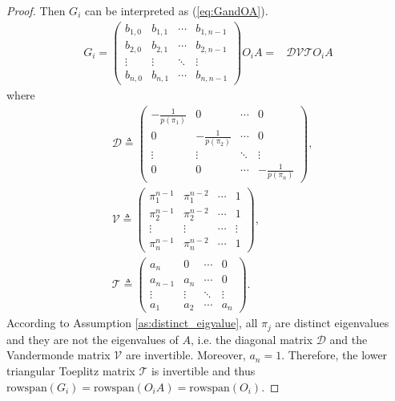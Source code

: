 \documentclass[journal]{IEEEtran}
\newcommand{\rs}{\text{rowspan}}
\newtheorem*{proof}{\textbf{Proof}}
\begin{document}
\begin{proof}
		Then $G_i$ can be interpreted as (\ref{eq:GandOA}).
		\begin{align}
			G_i = \begin{pmatrix}
				b_{1,0} & b_{1,1} & \cdots  & b_{1,n-1} \\
				b_{2,0} & b_{2,1} & \cdots  & b_{2,n-1} \\
				\vdots & \vdots & \ddots  & \vdots \\
				b_{n,0} & b_{n,1} & \cdots  & b_{n,n-1} 
			\end{pmatrix}
			O_i A 
			= & \mathcal{D}\mathcal{V}\mathcal{T}O_i A \label{eq:GandOA}		
		\end{align}
		where 
		\begin{align*}
			&\mathcal{D}\triangleq\begin{pmatrix}
				-\frac{1}{p(\pi_1)} & 0 & \cdots  & 0 \\
				0 & -\frac{1}{p(\pi_2)} & \cdots  & 0 \\
				\vdots & \vdots & \ddots  & \vdots \\
				0 & 0 & \cdots  & -\frac{1}{p(\pi_n)}
			\end{pmatrix}, \\
			&\mathcal{V}\triangleq
			\begin{pmatrix}
				\pi_1^{n-1} & \pi_1^{n-2} & \cdots  & 1 \\
				\pi_2^{n-1} & \pi_2^{n-2} & \cdots  & 1 \\
				\vdots & \vdots & \cdots  & \vdots \\
				\pi_n^{n-1} & \pi_n^{n-2} & \cdots  & 1
			\end{pmatrix}, \\
			&\mathcal{T}\triangleq
			\begin{pmatrix}
				a_n & 0 & \cdots &   0 \\
				a_{n-1} & a_n & \cdots &   0 \\
				\vdots & \vdots & \ddots  & \vdots \\
				a_1 & a_2 & \cdots  & a_n 
			\end{pmatrix}.
		\end{align*}
		According to Assumption \ref{as:distinct_eigvalue}, all $\pi_j$ are distinct eigenvalues and they are not the eigenvalues of $A$, i.e. the diagonal matrix $\mathcal{D}$ and the Vandermonde matrix $\mathcal{V}$ are invertible. Moreover, $a_n=1$. Therefore, the lower triangular Toeplitz matrix $\mathcal{T}$ is invertible and thus $\rs(G_i)=\rs(O_i A)=\rs(O_i)$. 		
	\end{proof}
	
\end{document}
